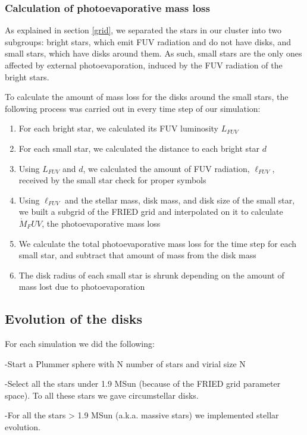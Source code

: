 \documentclass[fleqn,usenatbib]{mnras}
\newcommand\note[1]{{\colorbox{yellow!60}{\color{magenta}#1}}}
\begin{document}
\subsubsection{Calculation of photoevaporative mass loss}\label{massloss}
As explained in section \ref{grid}, we separated the stars in our cluster into two subgroups: bright stars, which emit FUV radiation and do not have disks, and small stars, which have disks around them. As such, small stars are the only ones affected by external photoevaporation, induced by the FUV radiation of the bright stars.

To calculate the amount of mass loss for the disks around the small stars, the following process was carried out in every time step of our simulation:

\begin{enumerate}
\item For each bright star, we calculated its FUV luminosity $L_{FUV}$ 
\item For each small star, we calculated the distance to each bright star $d$
\item Using $L_{FUV}$ and $d$, we calculated the amount of FUV radiation, $\ell_{FUV}$, received by the small star \note{check for proper symbols}
\item Using $\ell_{FUV}$ and the stellar mass, disk mass, and disk size of the small star, we built a subgrid of the FRIED grid and interpolated on it to calculate $\dot{M}_FUV$, the photoevaporative mass loss 
\item We calculate the total photoevaporative mass loss for the time step for each small star, and subtract that amount of mass from the disk mass
\item The disk radius of each small star is shrunk depending on the amount of mass lost due to photoevaporation
\end{enumerate}

\subsection{Evolution of the disks}
For each simulation we did the following:

-Start a Plummer sphere with N number of stars and virial size N

-Select all the stars under 1.9 MSun (because of the FRIED grid parameter space). To all these stars we gave circumstellar disks.

-For all the stars > 1.9 MSun (a.k.a. massive stars) we implemented stellar evolution.
\end{document}
